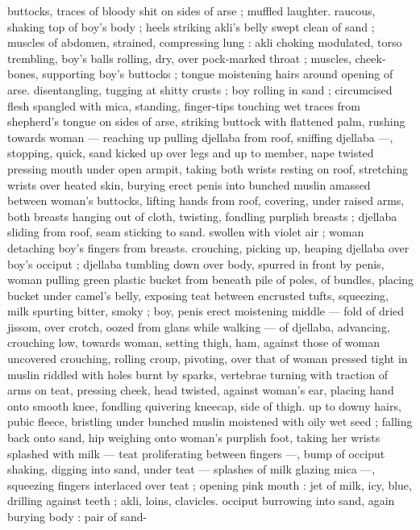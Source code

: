buttocks, traces of bloody shit on sides of arse ; muffled laughter. 
raucous, shaking top of boy's body ; heels striking akli's belly swept 
clean of sand ; muscles of abdomen, strained, compressing lung : 
akli choking modulated, torso trembling, boy's balls rolling, dry, over 
pock-marked throat ; muscles, cheek-bones, supporting boy's 
buttocks ; tongue moistening hairs around opening of arse. 
disentangling, tugging at shitty crusts ; boy rolling in sand ; 
circumcised flesh spangled with mica, standing, finger-tips touching 
wet traces from shepherd's tongue on sides of arse, striking buttock 
with flattened palm, rushing towards woman --- reaching up pulling 
djellaba from roof, sniffing djellaba ---, stopping, quick, sand kicked 
up over legs and up to member, nape twisted pressing mouth under 
open armpit, taking both wrists resting on roof, stretching wrists over 
heated skin, burying erect penis into bunched muslin amassed 
between woman's buttocks, lifting hands from roof, covering, under 
raised arms, both breasts hanging out of cloth, twisting, fondling 
purplish breasts ; djellaba sliding from roof, seam sticking to sand. 
swollen with violet air ; woman detaching boy's fingers from breasts. 
crouching, picking up, heaping djellaba over boy's occiput ; djellaba 
tumbling down over body, spurred in front by penis, woman pulling 
green plastic bucket from beneath pile of poles, of bundles, placing 
bucket under camel's belly, exposing teat between encrusted tufts, 
squeezing, milk spurting bitter, smoky ; boy, penis erect moistening 
middle --- fold of dried jissom, over crotch, oozed from glans while 
walking --- of djellaba, advancing, crouching low, towards woman, 
setting thigh, ham, against those of woman uncovered crouching, 
rolling croup, pivoting, over that of woman pressed tight in muslin 
riddled with holes burnt by sparks, vertebrae turning with traction of 
arms on teat, pressing cheek, head twisted, against woman's ear, 
placing hand onto smooth knee, fondling quivering kneecap, side of 
thigh. up to downy hairs, pubic fleece, bristling under bunched 
muslin moistened with oily wet seed ; falling back onto sand, hip 
weighing onto woman's purplish foot, taking her wrists splashed with 
milk --- teat proliferating between fingers ---, bump of occiput 
shaking, digging into sand, under teat --- splashes of milk glazing 
mica ---, squeezing fingers interlaced over teat ; opening pink mouth 
: jet of milk, icy, blue, drilling against teeth ; akli, loins, clavicles. 
occiput burrowing into sand, again burying body : pair of sand- 
